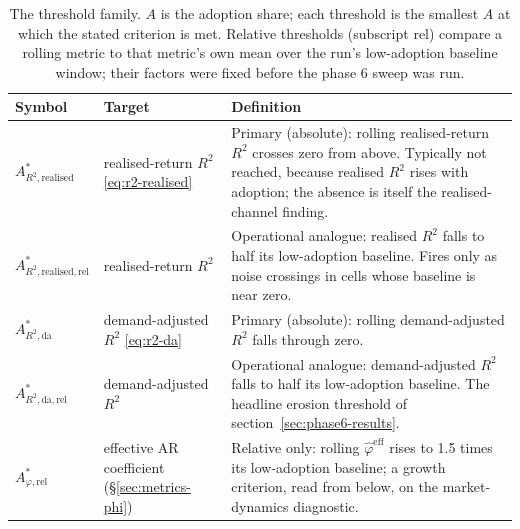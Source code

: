 \documentclass[12pt]{article}
\begin{document}
\begin{table}[h]
\centering
\caption{The threshold family. $A$ is the adoption share; each threshold is the smallest $A$ at which the stated criterion is met. Relative thresholds (subscript rel) compare a rolling metric to that metric's own mean over the run's low-adoption baseline window; their factors were fixed before the phase 6 sweep was run.} %
\label{tab:a-star}
\begin{tabularx}{\textwidth}{@{}l l X@{}}
\toprule
Symbol & Target & Definition \\
\midrule
$A^{*}_{R^{2},\mathrm{realised}}$ & realised-return $R^{2}$ \eqref{eq:r2-realised} & Primary (absolute): rolling realised-return $R^{2}$ crosses zero from above. Typically not reached, because realised $R^{2}$ rises with adoption; the absence is itself the realised-channel finding. \\ %
$A^{*}_{R^{2},\mathrm{realised},\mathrm{rel}}$ & realised-return $R^{2}$ & Operational analogue: realised $R^{2}$ falls to half its low-adoption baseline. Fires only as noise crossings in cells whose baseline is near zero. \\ %
$A^{*}_{R^{2},\mathrm{da}}$ & demand-adjusted $R^{2}$ \eqref{eq:r2-da} & Primary (absolute): rolling demand-adjusted $R^{2}$ falls through zero. \\ %
$A^{*}_{R^{2},\mathrm{da},\mathrm{rel}}$ & demand-adjusted $R^{2}$ & Operational analogue: demand-adjusted $R^{2}$ falls to half its low-adoption baseline. The headline erosion threshold of section~\ref{sec:phase6-results}. \\ %
$A^{*}_{\varphi,\mathrm{rel}}$ & effective AR coefficient (\S\ref{sec:metrics-phi}) & Relative only: rolling $\hat{\varphi}^{\mathrm{eff}}$ rises to 1.5 times its low-adoption baseline; a growth criterion, read from below, on the market-dynamics diagnostic. \\ %
\bottomrule
\end{tabularx}
\end{table}
\end{document}
